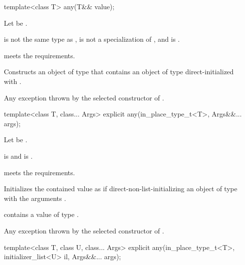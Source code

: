 %
\begin{itemdecl}
template<class T>
  any(T&& value);
\end{itemdecl}

\begin{itemdescr}
\pnum
Let  be .

\pnum
\constraints
{} is not the same type as ,
 is not a specialization of ,
and  is .

\pnum
\expects
{} meets the  requirements.

\pnum
\effects
Constructs an object of type  that contains an object of type  direct-initialized with .

\pnum
\throws
Any exception thrown by the selected constructor of .
\end{itemdescr}

%
\begin{itemdecl}
template<class T, class... Args>
  explicit any(in_place_type_t<T>, Args&&... args);
\end{itemdecl}

\begin{itemdescr}
\pnum
Let  be .

\pnum
\constraints
{} is  and
 is .

\pnum
\expects
{} meets the  requirements.

\pnum
\effects
Initializes the contained value as if direct-non-list-initializing an object of
type  with the arguments .

\pnum
\ensures
{} contains a value of type .

\pnum
\throws
Any exception thrown by the selected constructor of .
\end{itemdescr}

%
\begin{itemdecl}
template<class T, class U, class... Args>
  explicit any(in_place_type_t<T>, initializer_list<U> il, Args&&... args);
\end{itemdecl}

